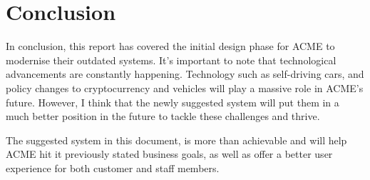 \section{Conclusion}
  In conclusion, this report has covered the initial design phase for ACME to modernise their outdated systems. It's important to note that technological
  advancements are constantly happening. Technology such as self-driving cars, and policy changes to cryptocurrency and vehicles will play a massive role
  in ACME's future. However, I think that the newly suggested system will put them in a much better position in the future to tackle these challenges and thrive.
  
  The suggested system in this document, is more than achievable and will help ACME hit it previously stated business goals, as well as offer a better
  user experience for both customer and staff members.
\newpage